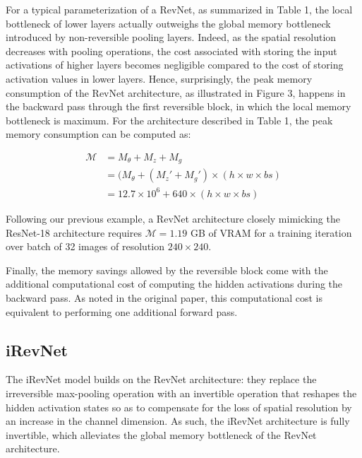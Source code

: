 \documentclass[twocolumn]{bmcart}
\begin{document}
For a typical parameterization of a RevNet, as summarized in Table 1, 
the local bottleneck of lower layers actually outweighs the global memory bottleneck introduced by non-reversible pooling layers.
Indeed, as the spatial resolution decreases with pooling operations, 
the cost associated with storing the input activations of higher layers becomes 
negligible compared to the cost of storing activation values in lower layers.
Hence, surprisingly, the peak memory consumption of the RevNet architecture, as illustrated in Figure 3, 
happens in the backward pass through the first reversible block,
in which the local memory bottleneck is maximum.
For the architecture described in Table 1, the peak memory consumption can be computed as:

\begin{subequations}
\begin{align}
\mathcal{M} &= M_{\theta} + M_{z} + M_{g} \\
            &=(M_{\theta} + (M_z' + M_{g}') \times (h \times w \times bs) \\
            &= 12.7 \times 10^6 + 640 \times (h \times w \times bs) 
\end{align}
\end{subequations}

Following our previous example, a RevNet architecture closely mimicking the ResNet-18 architecture
requires $\mathcal{M}=1.19$ GB of VRAM for a training iteration over batch of 32 images of resolution $240 \times 240$.

Finally, the memory savings allowed by the reversible block come with the additional computational cost of computing the hidden activations during the backward pass.
As noted in the original paper, this computational cost is equivalent to performing one additional forward pass.

\subsection{iRevNet}

The iRevNet model builds on the RevNet architecture: they replace the irreversible max-pooling operation with an invertible operation that reshapes the hidden activation states
so as to compensate for the loss of spatial resolution by an increase in the channel dimension. 
As such, the iRevNet architecture is fully invertible, which alleviates the global memory bottleneck of the RevNet architecture.
\end{document}
